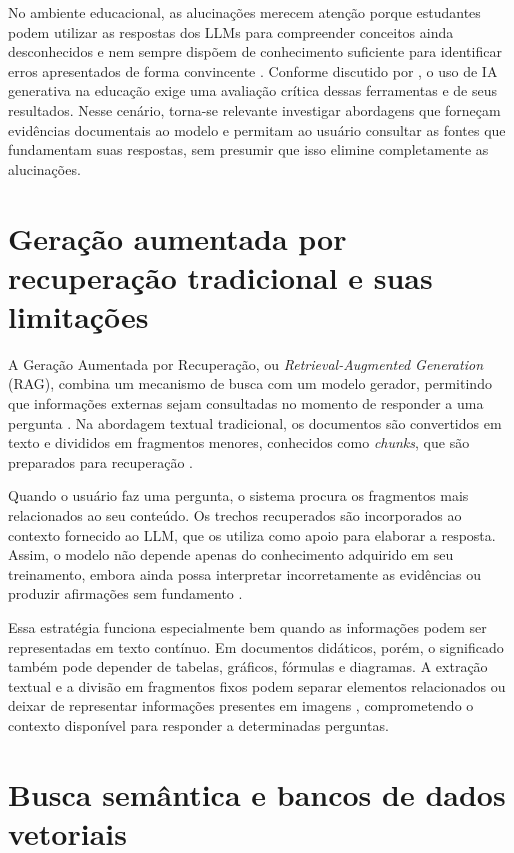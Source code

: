 No ambiente educacional, as alucinações merecem atenção porque estudantes podem utilizar as respostas dos LLMs para compreender conceitos ainda desconhecidos e nem sempre dispõem de conhecimento suficiente para identificar erros apresentados de forma convincente . Conforme discutido por , o uso de IA generativa na educação exige uma avaliação crítica dessas ferramentas e de seus resultados. Nesse cenário, torna-se relevante investigar abordagens que forneçam evidências documentais ao modelo e permitam ao usuário consultar as fontes que fundamentam suas respostas, sem presumir que isso elimine completamente as alucinações.

\section{Geração aumentada por recuperação tradicional e suas limitações}
\label{sec:rag_tradicional}

A Geração Aumentada por Recuperação, ou \textit{Retrieval-Augmented Generation} (RAG), combina um mecanismo de busca com um modelo gerador, permitindo que informações externas sejam consultadas no momento de responder a uma pergunta . Na abordagem textual tradicional, os documentos são convertidos em texto e divididos em fragmentos menores, conhecidos como \textit{chunks}, que são preparados para recuperação .

Quando o usuário faz uma pergunta, o sistema procura os fragmentos mais relacionados ao seu conteúdo. Os trechos recuperados são incorporados ao contexto fornecido ao LLM, que os utiliza como apoio para elaborar a resposta. Assim, o modelo não depende apenas do conhecimento adquirido em seu treinamento, embora ainda possa interpretar incorretamente as evidências ou produzir afirmações sem fundamento .

Essa estratégia funciona especialmente bem quando as informações podem ser representadas em texto contínuo. Em documentos didáticos, porém, o significado também pode depender de tabelas, gráficos, fórmulas e diagramas. A extração textual e a divisão em fragmentos fixos podem separar elementos relacionados  ou deixar de representar informações presentes em imagens , comprometendo o contexto disponível para responder a determinadas perguntas.

\section{Busca semântica e bancos de dados vetoriais}
\label{sec:busca_semantica}

